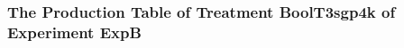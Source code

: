  \begin{frame}
 \fontsize{8pt}{9pt}\selectfont
 \frametitle{ The Production Table of Treatment BoolT3sgp4k of Experiment ExpB }

 \label{ExpBGrammarTable020.tex}  
 \end{frame}

